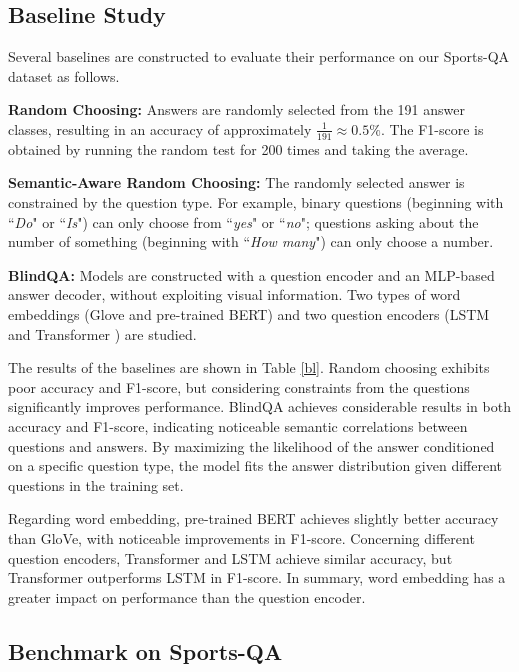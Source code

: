 {\subsection{Baseline Study}



Several baselines are constructed to evaluate their performance on our Sports-QA dataset as follows.

\noindent\textbf{Random Choosing:} Answers are randomly selected from the 191 answer classes, resulting in an accuracy of approximately $\frac{1}{191} \approx 0.5\%$. The F1-score is obtained by running the random test for 200 times and taking the average.

\noindent\textbf{Semantic-Aware Random Choosing:} The randomly selected answer is constrained by the question type. For example, binary questions (beginning with ``\textit{Do}" or ``\textit{Is}") can only choose from ``\textit{yes}" or ``\textit{no}"; questions asking about the number of something (beginning with ``\textit{How many}") can only choose a number.

\noindent\textbf{BlindQA:} Models are constructed with a question encoder and an MLP-based answer decoder, without exploiting visual information. Two types of word embeddings (Glove and pre-trained BERT) and two question encoders (LSTM and Transformer \citep{vaswani2017attention}) are studied.

The results of the baselines are shown in Table \ref{bl}. Random choosing exhibits poor accuracy and F1-score, but considering constraints from the questions significantly improves performance. BlindQA achieves considerable results in both accuracy and F1-score, indicating noticeable semantic correlations between questions and answers. By maximizing the likelihood of the answer conditioned on a specific question type, the model fits the answer distribution given different questions in the training set.

Regarding word embedding, pre-trained BERT achieves slightly better accuracy than GloVe, with noticeable improvements in F1-score. Concerning different question encoders, Transformer and LSTM achieve similar accuracy, but Transformer outperforms LSTM in F1-score. In summary, word embedding has a greater impact on performance than the question encoder.

\subsection{Benchmark on Sports-QA}

}
